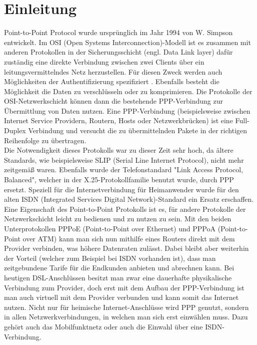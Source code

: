\documentclass[journal,11pt]{IEEEtran}
\begin{document}
\section{Einleitung} 
 Point-to-Point Protocol wurde urspr\"unglich im Jahr 1994 von W. Simpson entwickelt. Im OSI (Open Systems Interconnection)-Modell ist es zusammen mit anderen Protokollen in der Sicherungsschicht (engl. Data Link layer) daf\"ur zust\"andig eine direkte Verbindung zwischen zwei Clients \"uber ein leitungsvermittelndes Netz herzustellen. F\"ur diesen Zweck werden auch M\"oglichkeiten der Authentifizierung spezifiziert \cite{RFC1661}. Ebenfalls besteht die M\"oglichkeit die Daten zu verschl\"usseln oder zu komprimieren. Die Protokolle der OSI-Netzwerkschicht k\"onnen dann die bestehende PPP-Verbindung zur \"Ubermittlung von Daten nutzen. Eine PPP-Verbindung (beispielsweise zwischen Internet Service Providern, Routern, Hosts oder Netzwerkbr\"ucken) ist eine Full-Duplex Verbindung und versucht die zu \"ubermittelnden Pakete in der richtigen Reihenfolge zu \"ubertragen.\\
Die Notwendigkeit dieses Protokolls war zu dieser Zeit sehr hoch, da \"altere Standards, wie beispielsweise SLIP (Serial Line Internet Protocol), nicht mehr zeitgem\"a\ss{} waren. Ebenfalls wurde der Telefonstandard "Link Access Protocol, Balanced", welcher in der X.25-Protokollfamilie benutzt wurde, durch PPP ersetzt.  Speziell f\"ur die Internetverbindung f\"ur Heimanwender wurde f\"ur den alten ISDN (Integrated Services Digital Network)-Standard ein Ersatz erschaffen. Eine Eigenschaft des Point-to-Point Protokolls ist es, f\"ur andere Protokolle der Netzwerkschicht leicht zu bedienen und zu nutzen zu sein. Mit den beiden Unterprotokollen PPPoE (Point-to-Point over Ethernet)\cite{RFC2516} und PPPoA (Point-to-Point over ATM)\cite{RFC2364} kann man sich nun mithilfe eines Routers direkt mit dem Provider verbinden, was h\"ohere Datenraten zul\"asst. Dabei bleibt aber weiterhin der Vorteil (welcher zum Beispiel bei ISDN vorhanden ist), dass man zeitgebundene Tarife f\"ur die Endkunden anbieten und abrechnen kann. Bei heutigen DSL-Anschl\"ussen besitzt man zwar eine dauerhafte physikalische Verbindung zum Provider, doch erst mit dem Aufbau der PPP-Verbindung ist man auch virtuell mit dem Provider verbunden und kann somit das Internet nutzen. Nicht nur f\"ur heimische Internet-Anschl\"usse wird PPP genutzt, sondern in allen Netzwerkverbindungen, in welchen man sich erst einw\"ahlen muss. Dazu geh\"ort auch das Mobilfunktnetz oder auch die Einwahl \"uber eine ISDN-Verbindung.\\
\end{document}

